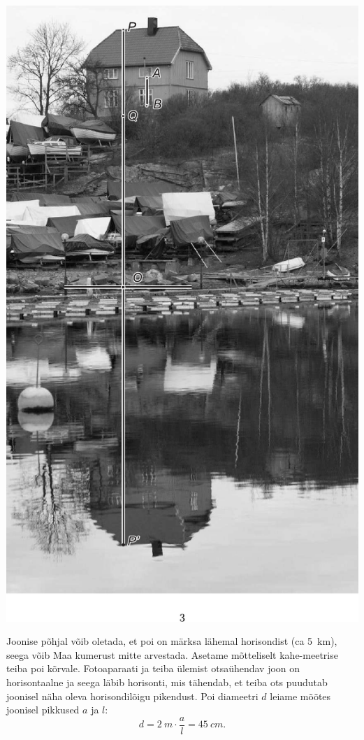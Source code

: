 \documentclass[10pt]{article}
\begin{document}
{\begin{center}
	\includegraphics[height=\textheight]{2008-v3g-04-lah}
\end{center}
\probend
\bigskip


\solu
Joonise põhjal võib oletada, et poi on märksa lähemal horisondist (ca \SI{5}{km}), seega võib Maa kumerust mitte arvestada. Asetame mõtteliselt kahe-meetrise teiba poi kõrvale. Fotoaparaati ja teiba ülemist otsaühendav joon on horisontaalne ja seega läbib horisonti, mis tähendab, et teiba ots puudutab joonisel näha oleva horisondilõigu pikendust. Poi diameetri $d$ leiame mõõtes joonisel pikkused $a$ ja $l$:
\[
d = \SI{2}{m} \cdot \frac al = \SI{45}{cm}.
\]

}
\end{document}
